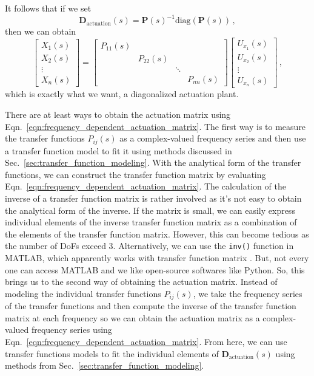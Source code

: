 It follows that if we set
\begin{equation}
	\mathbf{D}_\mathrm{actuation}(s) = \mathbf{P}(s)^{-1}\text{diag}\left(\mathbf{P}(s)\right)\,,
	\label{eqn:frequency_dependent_actuation_matrix}
\end{equation}
then we can obtain
\begin{equation}
	\begin{bmatrix}
		X_1(s)\\
		X_2(s)\\
		\vdots\\
		X_n(s)
	\end{bmatrix}
	=
	\begin{bmatrix}
		P_{11}(s) &  &  & \\
		& P_{22}(s) &  & \\
		&&\ddots&\\
		&&&P_{nn}(s)
	\end{bmatrix}
	\begin{bmatrix}
		U_{x_1}(s)\\
		U_{x_2}(s)\\
		\vdots\\
		U_{x_n}(s)
	\end{bmatrix}
	\,,
\end{equation}
which is exactly what we want, a diagonalized actuation plant.

There are at least ways to obtain the actuation matrix using Eqn.~\eqref{eqn:frequency_dependent_actuation_matrix}.
The first way is to measure the transfer functions $P_{ij}(s)$ as a complex-valued frequency series and then use a transfer function model to fit it using methods discussed in Sec.~\ref{sec:transfer_function_modeling}.
With the analytical form of the transfer functions, we can construct the transfer function matrix by evaluating Eqn.~\eqref{eqn:frequency_dependent_actuation_matrix}.
The calculation of the inverse of a transfer function matrix is rather involved as it's not easy to obtain the analytical form of the inverse.
If the matrix is small, we can easily express individual elements of the inverse transfer function matrix as a combination of the elements of the transfer function matrix.
However, this can become tedious as the number of DoFs exceed 3.
Alternatively, we can use the \verb|inv()| function in MATLAB, which apparently works with transfer function matrix \cite{invert_models_matlab}.
But, not every one can access MATLAB and we like open-source softwares like Python.
So, this brings us to the second way of obtaining the actuation matrix.
Instead of modeling the individual transfer functions $P_{ij}(s)$, we take the frequency series of the transfer functions and then compute the inverse of the transfer function matrix at each frequency so we can obtain the actuation matrix as a complex-valued frequency series using Eqn.~\eqref{eqn:frequency_dependent_actuation_matrix}.
From here, we can use transfer functions models to fit the individual elements of $\mathbf{D}_\mathrm{actuation}(s)$ using methods from Sec.~\ref{sec:transfer_function_modeling}.

